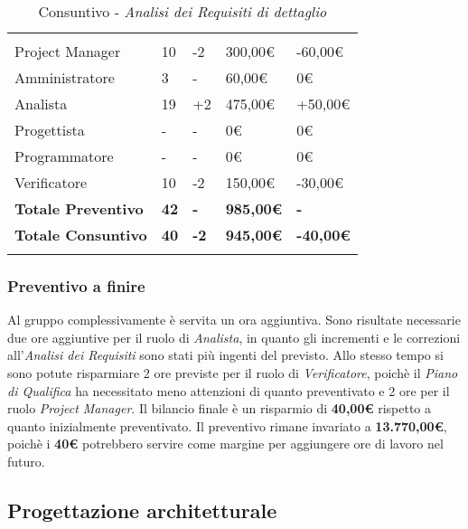 \begin{table}[H]
	\centering
	\begin{tabular}{|p{3.8cm}|C{2.6cm}|C{2.9cm}|C{2.7cm}|C{3.3cm}|}
		
		 & & & & \\
		Project Manager  & 10 & -2 & 300,00\euro & -60,00\euro \\
		\hline
		Amministratore& 3 & - & 60,00\euro & 0\euro \\
		\hline
		Analista      & 19 & +2 & 475,00\euro & +50,00\euro \\
		\hline
		Progettista   & -  & - & 0\euro & 0\euro \\
		\hline
		Programmatore & -  & - & 0\euro & 0\euro \\
		\hline
		Verificatore  & 10 & -2 & 150,00\euro & -30,00\euro \\
		\textbf{Totale Preventivo} & \textbf{42} & \textbf{-} & \textbf{985,00\euro} & \textbf{-}\\
		\textbf{Totale Consuntivo} & \textbf{40} & \textbf{-2} & \textbf{945,00\euro} & \textbf{-40,00\euro}\\
	\end{tabular}
	\caption{Consuntivo - \textit{Analisi dei Requisiti di dettaglio}}
	
\end{table}
\subsubsection{Preventivo a finire}
Al gruppo complessivamente è servita un ora aggiuntiva. Sono risultate necessarie due ore aggiuntive per il ruolo di \textit{Analista}, in quanto gli incrementi e le correzioni all'\textit{Analisi dei Requisiti} sono stati più ingenti del previsto. Allo stesso tempo si sono potute risparmiare 2 ore previste per il ruolo di \textit{Verificatore}, poichè il \textit{Piano di Qualifica} ha necessitato meno attenzioni di quanto preventivato e 2 ore per il ruolo \textit{Project Manager}. Il bilancio finale è un risparmio di \textbf{40,00\euro} rispetto a quanto inizialmente preventivato. Il preventivo rimane invariato a \textbf{13.770,00\euro}, poichè i \textbf{40\euro}  potrebbero servire come margine per aggiungere ore di lavoro nel futuro.


\subsection{Progettazione architetturale}

